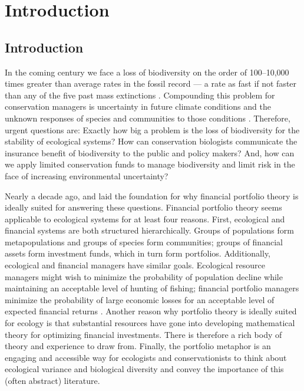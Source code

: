 \chapter[Introduction]{Introduction}

\section{Introduction}\label{introduction-1}

In the coming century we face a loss of biodiversity on the order of 100--10,000 times greater than average rates in the fossil record \citep{mea2005} --- a rate as fast if not faster than any of the five past mass extinctions \citep{barnosky2011, harnik2012}. Compounding this problem for conservation managers is uncertainty in future climate conditions \citep{heller2009} and the unknown responses of species and communities to those conditions \citep{lavergne2010}. Therefore, urgent questions are: Exactly how big a problem is the loss of biodiversity for the stability of ecological systems? How can conservation biologists communicate the insurance benefit of biodiversity to the public and policy makers? And, how can we apply limited conservation funds to manage biodiversity and limit risk in the face of increasing environmental uncertainty?

Nearly a decade ago, \citet{figge2004} and \citet{koellner2006} laid the foundation for why financial portfolio theory is ideally suited for answering these questions. Financial portfolio theory seems applicable to ecological systems for at least four reasons. First, ecological and financial systems are both structured hierarchically. Groups of populations form metapopulations and groups of species form communities; groups of financial assets form investment funds, which in turn form portfolios. Additionally, ecological and financial managers have similar goals. Ecological resource managers might wish to minimize the probability of population decline while maintaining an acceptable level of hunting of fishing; financial portfolio managers minimize the probability of large economic losses for an acceptable level of expected financial returns \citep{may2008}. Another reason why portfolio theory is ideally suited for ecology is that substantial resources have gone into developing mathematical theory for optimizing financial investments. There is therefore a rich body of theory and experience to draw from. Finally, the portfolio metaphor is an engaging and accessible way for ecologists and conservationists to think about ecological variance and biological diversity and convey the importance of this (often abstract) literature.

